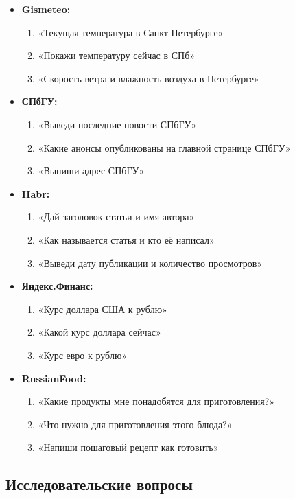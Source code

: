 \begin{itemize}
    \item \textbf{Gismeteo:}
    \begin{enumerate}
        \item «Текущая температура в Санкт-Петербурге»
        \item «Покажи температуру сейчас в СПб»
        \item «Скорость ветра и влажность воздуха в Петербурге»
    \end{enumerate}
    \item \textbf{СПбГУ:}
    \begin{enumerate}
        \item «Выведи последние новости СПбГУ»
        \item «Какие анонсы опубликованы на главной странице СПбГУ»
        \item «Выпиши адрес СПбГУ»
    \end{enumerate}
    \item \textbf{Habr:}
    \begin{enumerate}
        \item «Дай заголовок статьи и имя автора»
        \item «Как называется статья и кто её написал»
        \item «Выведи дату публикации и количество просмотров»
    \end{enumerate}
    \item \textbf{Яндекс.Финанс:}
    \begin{enumerate}
        \item «Курс доллара США к рублю»
        \item «Какой курс доллара сейчас»
        \item «Курс евро к рублю»
    \end{enumerate}
    \item \textbf{RussianFood:}
    \begin{enumerate}
        \item «Какие продукты мне понадобятся для приготовления?»
        \item «Что нужно для приготовления этого блюда?»
        \item «Напиши пошаговый рецепт как готовить»
    \end{enumerate}
\end{itemize}

\subsection{Исследовательские вопросы}

